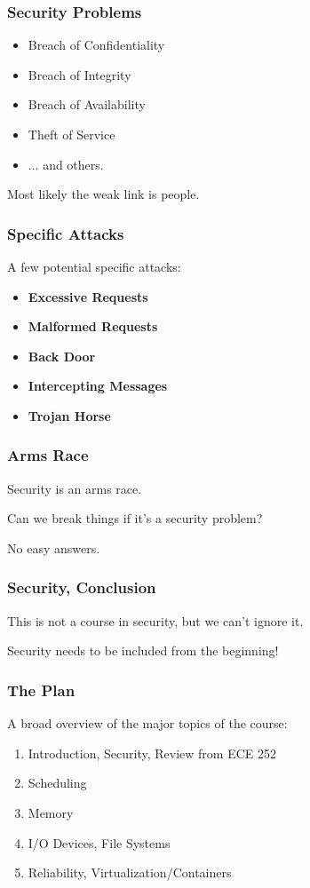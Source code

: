 \begin{frame}
\frametitle{Security Problems}

\begin{itemize}
	\item Breach of Confidentiality
	\item Breach of Integrity
	\item Breach of Availability
	\item Theft of Service
	\item ... and others.
\end{itemize}

Most likely the weak link is people.

\end{frame}


\begin{frame}
\frametitle{Specific Attacks}
A few potential specific attacks:

\begin{itemize}
	\item \textbf{Excessive Requests}
	\item \textbf{Malformed Requests}
	\item \textbf{Back Door}
	\item \textbf{Intercepting Messages}
	\item \textbf{Trojan Horse}
\end{itemize}


\end{frame}


\begin{frame}
\frametitle{Arms Race}

Security is an arms race.

Can we break things if it's a security problem?

No easy answers.


\end{frame}


\begin{frame}
\frametitle{Security, Conclusion}

This is not a course in security, but we can't ignore it.

Security needs to be included from the beginning!


\end{frame}


\begin{frame}
\frametitle{The Plan}

A broad overview of the major topics of the course:

\begin{enumerate}
	\item Introduction, Security, Review from ECE 252
	\item Scheduling
	\item Memory
	\item I/O Devices, File Systems
	\item Reliability, Virtualization/Containers
\end{enumerate}

\end{frame}





